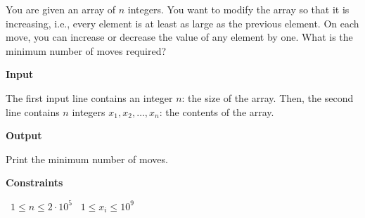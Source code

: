 You are given an array of $n$ integers. You want to modify the array so that it is increasing, i.e., every element is at least as large as the previous element.
On each move, you can increase or decrease the value of any element by one. What is the minimum number of moves required?

\vspace{0.3cm}\noindent\textbf{Input}

The first input line contains an integer $n$: the size of the array.
Then, the second line contains $n$ integers $x_1,x_2,\ldots,x_n$: the contents of the array.

\vspace{0.3cm}\noindent\textbf{Output}

Print the minimum number of moves.

\vspace{0.3cm}\noindent\textbf{Constraints}

\textbullet\ $1 \le n \le 2 \cdot 10^5$
\textbullet\ $1 \le x_i \le 10^9$